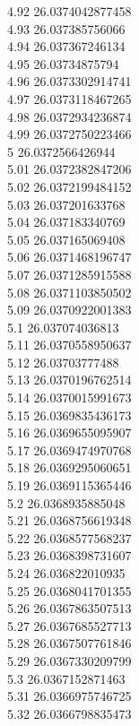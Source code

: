 {4.92	26.0374042877458\\
4.93	26.037385756066\\
4.94	26.037367246134\\
4.95	26.03734875794\\
4.96	26.0373302914741\\
4.97	26.0373118467265\\
4.98	26.0372934236874\\
4.99	26.0372750223466\\
5	26.0372566426944\\
5.01	26.0372382847206\\
5.02	26.0372199484152\\
5.03	26.037201633768\\
5.04	26.037183340769\\
5.05	26.037165069408\\
5.06	26.0371468196747\\
5.07	26.0371285915588\\
5.08	26.0371103850502\\
5.09	26.0370922001383\\
5.1	26.037074036813\\
5.11	26.0370558950637\\
5.12	26.03703777488\\
5.13	26.0370196762514\\
5.14	26.0370015991673\\
5.15	26.0369835436173\\
5.16	26.0369655095907\\
5.17	26.0369474970768\\
5.18	26.0369295060651\\
5.19	26.0369115365446\\
5.2	26.0368935885048\\
5.21	26.0368756619348\\
5.22	26.0368577568237\\
5.23	26.0368398731607\\
5.24	26.036822010935\\
5.25	26.0368041701355\\
5.26	26.0367863507513\\
5.27	26.0367685527713\\
5.28	26.0367507761846\\
5.29	26.0367330209799\\
5.3	26.0367152871463\\
5.31	26.0366975746725\\
5.32	26.0366798835473\\
}
